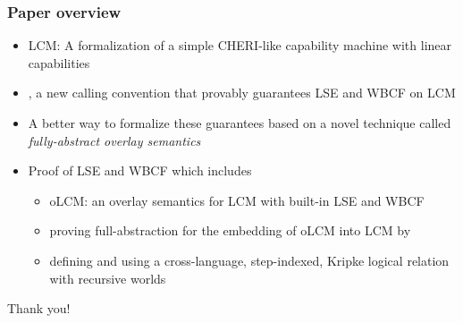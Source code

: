 \documentclass[aspectratio=169]{beamer}
\begin{document}
\begin{frame}
  \frametitle{Paper overview}
\begin{itemize}
\item LCM: A formalization of a simple CHERI-like capability machine with linear capabilities
\item \stktokens{}, a new calling convention that provably guarantees LSE and WBCF on LCM
\item A better way to formalize these guarantees based on a novel technique called \textit{fully-abstract overlay semantics}
\item Proof of LSE and WBCF which includes
  \begin{itemize}
  \item oLCM: an overlay semantics for LCM with built-in LSE and WBCF
  \item proving full-abstraction for the embedding of oLCM into LCM by
  \item defining and using a cross-language, step-indexed, Kripke logical relation with recursive worlds
  \end{itemize}
\end{itemize}
\end{frame}

\begin{frame}
  \centering
  Thank you!
\end{frame}

\end{document}
